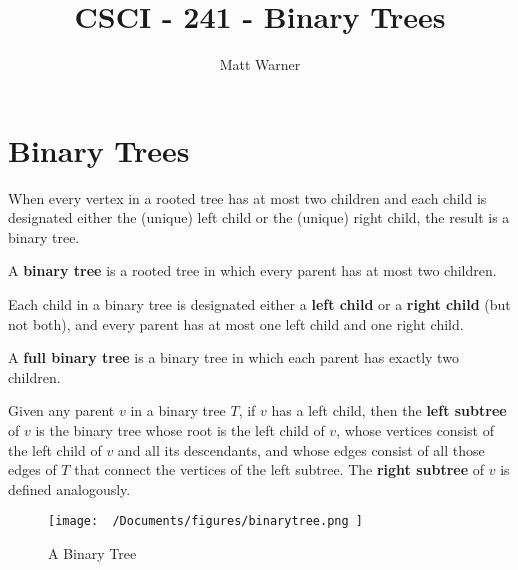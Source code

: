\documentclass{report}
\title{\Huge{CSCI - 241 - Binary Trees}}
\author{\huge{Matt Warner}}
\date{\huge{}}
\begin{document}
  \maketitle
  \section{Binary Trees}
	When every vertex in a rooted tree has at most two children and each child is designated either the (unique) left child or the (unique) right child, the result is a binary tree.
	\vspace{5mm}

\noindent	A \textbf{binary tree} is a rooted tree in which every parent has at most two children. 
	\vspace{3mm}

	\noindent Each child in a binary tree is designated either a \textbf{left child} or a \textbf{right child} (but not both), and every parent has at most one left child and one right child. 
	\vspace{3mm}

	\noindent A \textbf{full binary tree} is a binary tree in which each parent has exactly two children.
	\vspace{3mm}

\noindent	Given any parent $v$ in a binary tree $T$, if $v$ has a left child, then the \textbf{left subtree} of $v$ is the binary tree whose root is the left child of $v$, whose vertices consist of the left child of $v$ and all its descendants, and whose edges consist of all those edges of $T$ that connect the vertices of the left subtree. The \textbf{right subtree} of $v$ is defined analogously.
\vspace{3mm}

\begin{figure}[ht]
\centering
\texttt{[image:  ~/Documents/figures/binarytree.png ]}
\caption{A Binary Tree}
\end{figure}
\bigbreak \noindent
\end{document}
